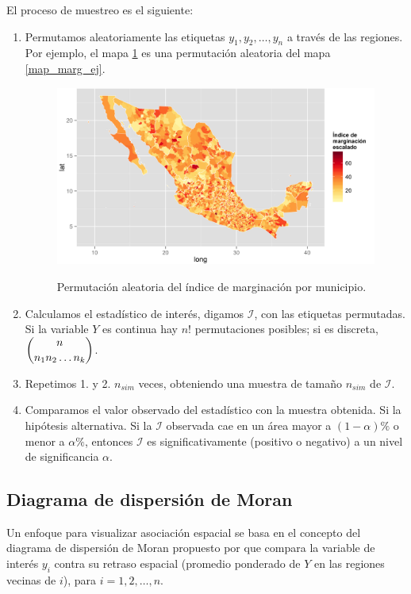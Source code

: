     El proceso de muestreo es el siguiente:
    \begin{enumerate}
    \item Permutamos aleatoriamente las etiquetas $y_1, y_2, \dots, y_n$ a través de las regiones. Por ejemplo, el mapa \ref{rmap_marg_ej} es una permutación aleatoria del mapa \ref{map_marg_ej}.
    \begin{figure}[!ht]
      \centering
      \includegraphics[width=\textwidth]{./maps/rmapmarg.png} \\
      \caption{ Permutación aleatoria del índice de marginación por municipio.}
      \label{rmap_marg_ej}  
    \end{figure}

    \item Calculamos el estadístico de interés, digamos $\mathcal{I}$, con las etiquetas permutadas. Si la variable $Y$ es continua hay $n!$ permutaciones posibles; si es discreta, $\dbinom{n}{n_1 n_2 \dots n_k}$.
    \item Repetimos 1. y 2. $n_{sim}$ veces, obteniendo una muestra de tamaño $n_{sim}$ de $\mathcal{I}$. 
    \item Comparamos el valor observado del estadístico con la muestra obtenida. Si la hipótesis alternativa. Si la $\mathcal{I}$ observada cae en un área mayor a $(1-\alpha)\%$ o menor a $\alpha\%$, entonces $\mathcal{I}$ es significativamente (positivo o negativo) a un nivel de significancia $\alpha$.
    \end{enumerate}


\subsection{Diagrama de dispersión de Moran} 
Un enfoque para visualizar asociación espacial se basa en el concepto del diagrama de dispersión de Moran propuesto por \citet{anselin93} que compara la variable de interés $y_i$  contra su retraso espacial (promedio ponderado de $Y$ en las regiones vecinas de $i$), para $i=1,2,\dots,n$. 

